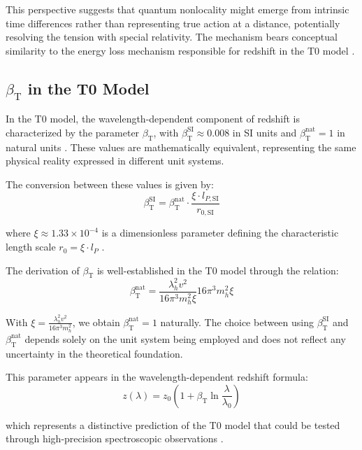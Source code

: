\documentclass[12pt,a4paper]{article}
\newcommand{\betaT}{\beta_{\text{T}}}
\begin{document}
	This perspective suggests that quantum nonlocality might emerge from intrinsic time differences rather than representing true action at a distance, potentially resolving the tension with special relativity. The mechanism bears conceptual similarity to the energy loss mechanism responsible for redshift in the T0 model \cite{pascher_messdifferenzen_2025}.
	
	\subsection{\(\betaT\) in the T0 Model}
	In the T0 model, the wavelength-dependent component of redshift is characterized by the parameter \(\betaT\), with \(\betaT^{\text{SI}} \approx 0.008\) in SI units and \(\betaT^{\text{nat}} = 1\) in natural units \cite{pascher_params_2025}. These values are mathematically equivalent, representing the same physical reality expressed in different unit systems.
	
	The conversion between these values is given by:
	\begin{equation}
		\betaT^{\text{SI}} = \betaT^{\text{nat}} \cdot \frac{\xi \cdot l_{P,\text{SI}}}{r_{0,\text{SI}}}
	\end{equation}
	
	where \(\xi \approx 1.33 \times 10^{-4}\) is a dimensionless parameter defining the characteristic length scale \(r_0 = \xi \cdot l_P\) \cite{pascher_temp_2025, pascher_alphabeta_2025}.
	
	The derivation of \(\betaT\) is well-established in the T0 model through the relation:
	\begin{equation}
		\betaT^{\text{nat}} = \frac{\lambda_h^2 v^2}{16\pi^3 m_h^2 \xi}{16\pi^3 m_h^2 \xi}
	\end{equation}
	
	With \(\xi = \frac{\lambda_h^2 v^2}{16\pi^3 m_h^2}\), we obtain \(\betaT^{\text{nat}} = 1\) naturally. The choice between using \(\betaT^{\text{SI}}\) and \(\betaT^{\text{nat}}\) depends solely on the unit system being employed and does not reflect any uncertainty in the theoretical foundation.
	
	This parameter appears in the wavelength-dependent redshift formula:
	\begin{equation}
		z(\lambda) = z_0 \left(1 + \betaT \ln\frac{\lambda}{\lambda_0}\right)
	\end{equation}
	
	which represents a distinctive prediction of the T0 model that could be tested through high-precision spectroscopic observations \cite{pascher_messdifferenzen_2025}.
	
\end{document}

